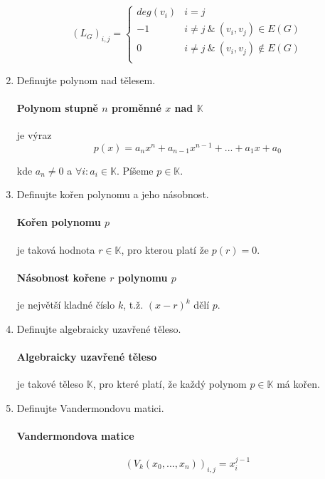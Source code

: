 \documentclass[10pt,a4paper]{article}
\theoremstyle{plain}
\theoremstyle{definition}
\begin{document}
\begin{enumerate}
\[ (L_G)_{i,j} = \begin{cases}  deg(v_i) & i = j  \\ 
								-1 & i \neq j \ \&\  (v_i, v_j) \in E(G) \\ 
								0  & i \neq j \ \&\  (v_i, v_j) \notin E(G) \\ \end{cases} \]

\item Definujte polynom nad tělesem.

\paragraph{Polynom stupně $n$ proměnné $x$ nad $\mathbb{K}$} je výraz
\[ p(x) = a_nx^n + a_{n-1}x^{n-1} + ... + a_1x + a_0\]

kde $a_n \neq 0$ a $\forall i: a_i \in \mathbb{K}$. Píšeme $p \in \mathbb{K}$.

\item Definujte kořen polynomu a jeho násobnost.

\paragraph{Kořen polynomu $p$} je taková hodnota $r \in \mathbb{K}$, pro kterou platí že $p(r) = 0$.

\paragraph{Násobnost kořene $r$ polynomu $p$} je největší kladné číslo $k$, t.ž. $(x-r)^k$ dělí $p$.

\item Definujte algebraicky uzavřené těleso.

\paragraph{Algebraicky uzavřené těleso} je takové těleso $\mathbb{K}$, pro které platí, že každý polynom $p \in \mathbb{K}$ má kořen.

\item Definujte Vandermondovu matici.

\paragraph{Vandermondova matice} 


\[ (V_{k}(x_0, ..., x_n))_{i,j} = x_i^{j-1} \]


\end{enumerate}
\end{document}
